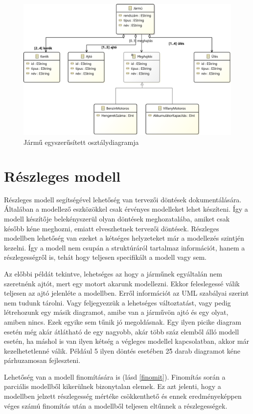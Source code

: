 \begin{figure}[!ht]
	\centering
	\includegraphics[width=130mm]{figures/vehicle.pdf}
	\caption{Jármű egyszerűsített osztálydiagramja} 
	\label{jarmu}
\end{figure}

\section{Részleges modell}
Részleges modell segítségével lehetőség van tervezői döntések dokumentálására. Általában a modellező eszközökkel csak érvényes modelleket lehet készíteni. Így a modell készítője belekényszerül olyan döntések meghozatalába, amiket csak később kéne meghozni, emiatt elveszhetnek tervezői döntések. Részleges modellben lehetőség van ezeket a kétséges helyzeteket már a modellezés szintjén kezelni. Így a modell nem csupán a struktúráról tartalmaz információt, hanem a részlegességről is, tehát hogy teljesen specifikált a modell vagy sem. 
\par
Az előbbi példát tekintve, lehetséges az hogy a járműnek egyáltalán nem szeretnénk ajtót, mert egy motort akarunk modellezni. Ekkor feleslegessé válik teljesen az ajtó jelenléte a modellben. Erről információt az UML szabályai szerint nem tudunk tárolni. Vagy feljegyezzük a lehetséges változtatást, vagy pedig létrehozunk egy másik diagramot, amibe van a járművön ajtó és egy olyat, amiben nincs. Ezek egyike sem tűnik jó megoldásnak. Egy ilyen picike diagram esetén még akár átlátható de egy nagyobb, akár több száz elemből álló modell esetén, ha máshol is van ilyen kétség a végleges modellel kapcsolatban, akkor már kezelhetetlenné válik. Például 5 ilyen döntés esetében 2\^5 darab diagramot kéne párhuzamosan fejleszteni.
\par
Lehetőség van a modell finomítására is (lásd \autoref{finomit}). Finomítás során a parciális modellből kikerülnek bizonytalan elemek. Ez azt jelenti, hogy a modellben jelzett részlegesség mértéke csökkenthető és ennek eredményeképpen véges számú finomítás után a modellből teljesen eltűnnek a részlegességek.

